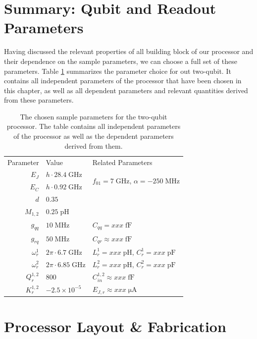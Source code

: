 \section{Summary: Qubit and Readout Parameters}

Having discussed the relevant properties of all building block of our processor and their dependence on the sample parameters, we can choose a full set of these parameters. Table \ref{table:processor_parameters} summarizes the parameter choice for out two-qubit. It contains all independent parameters of the processor that have been chosen in this chapter, as well as all dependent parameters and relevant quantities derived from these parameters.

\begin{table}
	\centering
	\begin{tabularx}{\textwidth}{r|X|l}
	Parameter & Value & Related Parameters \\ [0.3cm]
	$E_J$ & $h\cdot 28.4\;\mathrm{GHz}$ & \multirow{2}{*}{$f_{01}=7\;\mathrm{GHz}$, $\alpha=-250\;\mathrm{MHz}$} \\ [0.3cm]
	$E_C$ & $h\cdot 0.92\;\mathrm{GHz}$ & \\ [0.3cm]
	$d$ & $0.35$ & \\ [0.3cm]
	$M_{1,2}$ & $0.25\;\mathrm{pH}$ & \\ [0.3cm]
	$g_{qq}$  & $10\;\mathrm{MHz}$ & $C_{qq}=xxx\;\mathrm{fF}$ \\ [0.3cm]
	$g_{rq}$  & $50\;\mathrm{MHz}$ & $C_{qr}\approx xxx \;\mathrm{fF}$ \\ [0.3cm]
	$\omega_r^{1}$ & $2\pi\cdot 6.7\;\mathrm{GHz}$ & $L_r^1 = xxx\;\mathrm{pH}$, $C_r^1= xxx \;\mathrm{pF}$ \\ [0.3cm]
	$\omega_r^{2}$ & $2\pi\cdot 6.85\;\mathrm{GHz}$ & $L_r^2 = xxx\;\mathrm{pH}$, $C_r^2= xxx \;\mathrm{pF}$\\ [0.3cm]
	$Q_r^{1,2}$ & $800$ & $C_{in}^{1,2}\approx xxx \;\mathrm{fF}$ \\ [0.3cm]
	$K_r^{1,2}$ & $-2.5\times 10^{-5}$ & $E_{J,r}\approx xxx \;\mathrm{\mu A}$ \\ [0.3cm] 
	\end{tabularx}
	\caption[]{The chosen sample parameters for the two-qubit processor. The table contains all independent parameters of the processor as well as the dependent parameters derived from them.}
	\label{table:processor_parameters}
\end{table}

\section{Processor Layout \& Fabrication}

